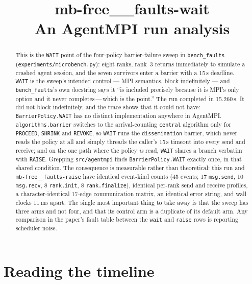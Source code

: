 \documentclass[11pt]{article}
\title{\textbf{mb-free\_\_faults-wait}\\[2pt]\large An AgentMPI run analysis}
\author{}
\date{}
\begin{document}
\maketitle

\begin{abstract}
This is the \texttt{WAIT} point of the four-policy barrier-failure sweep in
\texttt{bench\_faults} (\texttt{experiments/microbench.py}): eight ranks, rank~3 returns
immediately to simulate a crashed agent session, and the seven survivors enter a barrier
with a 15\,s deadline. \texttt{WAIT} is the sweep's intended control --- MPI semantics,
block indefinitely --- and \texttt{bench\_faults}'s own docstring says it ``is included
precisely because it is MPI's only option and it never completes\,---\,which is the
point.'' The run completed in 15.260\,s. It did not block indefinitely, and the trace
shows that it could not have: \texttt{BarrierPolicy.WAIT} has no distinct implementation
anywhere in AgentMPI. \texttt{algorithms.barrier} switches to the arrival-counting
\texttt{central} algorithm only for \texttt{PROCEED}, \texttt{SHRINK} and \texttt{REVOKE},
so \texttt{WAIT} runs the \texttt{dissemination} barrier, which never reads the policy at
all and simply threads the caller's 15\,s timeout into every send and receive; and on the
one path where the policy \emph{is} read, \texttt{WAIT} shares a branch verbatim with
\texttt{RAISE}. Grepping \texttt{src/agentmpi} finds \texttt{BarrierPolicy.WAIT} exactly
once, in that shared condition. The consequence is measurable rather than theoretical:
this run and \texttt{mb-free\_\_faults-raise} have identical event-kind counts (45 events;
17 \texttt{msg.send}, 10 \texttt{msg.recv}, 8 \texttt{rank.init}, 8
\texttt{rank.finalize}), identical per-rank send and receive profiles, a
character-identical 17-edge communication matrix, an identical error string, and wall
clocks 11\,ms apart. The single most important thing to take away is that the sweep has
three arms and not four, and that its control arm is a duplicate of its default arm. Any
comparison in the paper's fault table between the \texttt{wait} and \texttt{raise} rows is
reporting scheduler noise.
\end{abstract}



\section{Reading the timeline}
\end{document}
